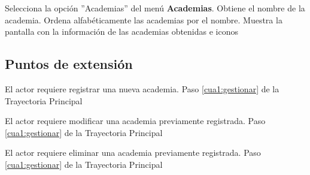 \begin{UCtrayectoria}
	
	\UCpaso [\UCactor] Selecciona la opción ''Academias'' del menú \textbf{Academias}. %
	\UCpaso [\UCsist] Obtiene el nombre de la academia.
	\UCpaso [\UCsist] Ordena alfabéticamente las academias por el nombre.
	\UCpaso[\UCsist] Muestra la pantalla  con la información de las academias obtenidas e iconos %
	\label{cua1:gestionar}
\end{UCtrayectoria}

\subsection{Puntos de extensión}

\UCExtensionPoint 
{El actor requiere registrar una nueva academia.}
{Paso \ref{cua1:gestionar} de la Trayectoria Principal}
{}

\UCExtensionPoint 
{El actor requiere modificar una academia previamente registrada.}
{Paso \ref{cua1:gestionar} de la Trayectoria Principal}
{}

\UCExtensionPoint 
{El actor requiere eliminar una academia previamente registrada.}
{Paso \ref{cua1:gestionar} de la Trayectoria Principal}
{}



